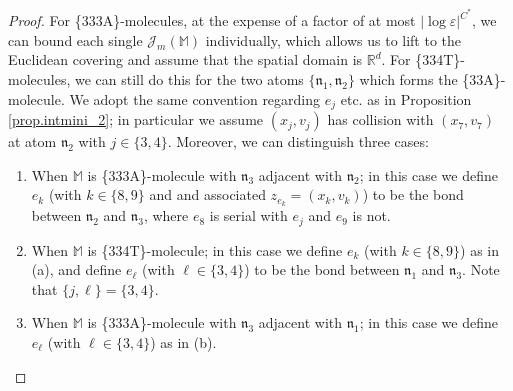 \documentclass[10pt, reqno]{amsart}
\newcommand{\Mb}{\mathbb M}
\newcommand{\Rb}{\mathbb R}
\newcommand {\Jc}{\mathcal J}
\newcommand{\nf}{\mathfrak n}
\theoremstyle{definition}
\theoremstyle{remark}
\numberwithin{equation}{section}
\begin{document}
\begin{proof} For \{333A\}-molecules, at the expense of a factor of at most $|\log \varepsilon|^{C^*}$, we can bound each single $\Jc_m(\Mb)$ individually, which allows us to lift to the Euclidean covering and assume that the spatial domain is $\Rb^d$. For \{334T\}-molecules, we can still do this for the two atoms $\{\nf_1,\nf_2\}$ which forms the \{33A\}-molecule. We adopt the same convention regarding $e_j$ etc. as in Proposition \ref{prop.intmini_2}; in particular we assume $(x_j,v_j)$ has collision with $(x_7,v_7)$ at atom $\nf_2$ with $j\in\{3,4\}$. Moreover, we can distinguish three cases:
\begin{enumerate}[{(a)}]
\item When $\Mb$ is \{333A\}-molecule with $\nf_3$ adjacent with $\nf_2$; in this case we define $e_k$ (with $k\in\{8,9\}$ and and associated $z_{e_k}=(x_k,v_k)$) to be the bond between $\nf_2$ and $\nf_3$, where $e_8$ is serial with $e_j$ and $e_9$ is not.
\item When $\Mb$ is \{334T\}-molecule; in this case we define $e_k$ (with $k\in\{8,9\}$) as in (a), and define $e_\ell$ (with $\ell\in\{3,4\}$) to be the bond between $\nf_1$ and $\nf_3$. Note that $\{j,\ell\}=\{3,4\}$.
\item When $\Mb$ is \{333A\}-molecule with $\nf_3$ adjacent with $\nf_1$; in this case we define $e_\ell$ (with $\ell\in\{3,4\}$) as in (b).
\end{enumerate}


\end{proof}
\end{document}

